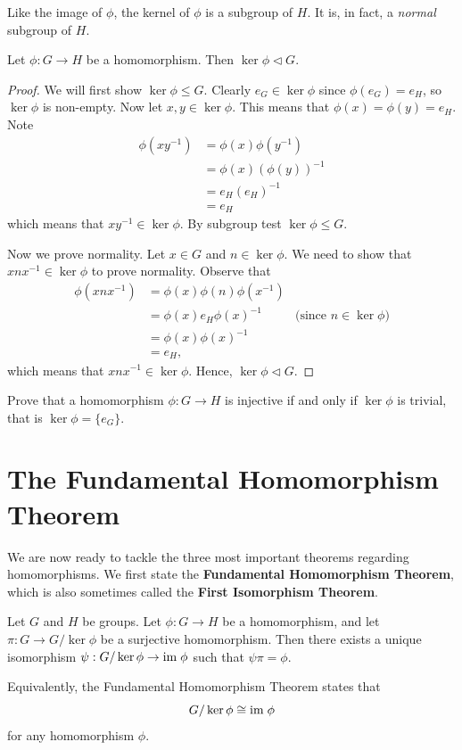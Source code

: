 Like the image of $\phi$, the kernel of $\phi$ is a subgroup of $H$. It is, in fact, a \textit{normal} subgroup of $H$.
\begin{proposition}\label{prop-kernel-is-normal-subgroup-of-domain}
    Let $\phi: G \to H$ be a homomorphism. Then $\ker\phi \lhd G$.
\end{proposition}
\begin{proof}
    We will first show $\ker\phi\leq G$. Clearly $e_G \in \ker\phi$ since $\phi(e_G) = e_H$, so $\ker\phi$ is non-empty. Now let $x, y \in \ker\phi$. This means that $\phi(x) = \phi(y) = e_H$. Note
    \begin{align*}
        \phi(xy^{-1}) &= \phi(x)\phi(y^{-1})\\
        &= \phi(x)\left(\phi(y)\right)^{-1}\\
        &= e_H(e_H)^{-1}\\
        &= e_H
    \end{align*}
    which means that $xy^{-1}\in\ker\phi$. By subgroup test $\ker\phi\leq G$.

    Now we prove normality. Let $x \in G$ and $n \in \ker\phi$. We need to show that $xnx^{-1}\in\ker\phi$ to prove normality. Observe that
    \begin{align*}
        \phi(xnx^{-1}) &= \phi(x)\phi(n)\phi(x^{-1})\\
        &= \phi(x)e_H\phi(x)^{-1} & \text{(since } n \in \ker\phi)\\
        &= \phi(x)\phi(x)^{-1}\\
        &= e_H,
    \end{align*}
    which means that $xnx^{-1} \in \ker\phi$. Hence, $\ker\phi \lhd G$.
\end{proof}

\begin{exercise}\label{exercise-trivial-kernel-means-injective}
    Prove that a homomorphism $\phi:G\to H$ is injective if and only if $\ker \phi$ is trivial, that is $\ker \phi = \{e_G\}$.
\end{exercise}

\newpage

\section{The Fundamental Homomorphism Theorem}
We are now ready to tackle the three most important theorems regarding homomorphisms. We first state the \textbf{Fundamental Homomorphism Theorem}, which is also sometimes called the \textbf{First Isomorphism Theorem}.
\begin{theorem}\label{thrm-first-isomorphism}
    Let $G$ and $H$ be groups. Let $\phi: G \to H$ be a homomorphism, and let $\pi: G \to G/\ker\phi$ be a surjective homomorphism. Then there exists a unique isomorphism $\psi: G/\ker\phi \to \mathrm{im}\;\phi$ such that $\psi\pi = \phi$.
\end{theorem}
Equivalently, the Fundamental Homomorphism Theorem states that
\[
    G/\ker\phi \cong \mathrm{im}\;\phi
\]
for any homomorphism $\phi$.

